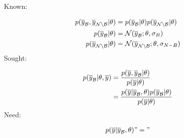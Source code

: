 Known:

\begin{align}
  p(\overline{y}_{\mathcal{B}}, \overline{y}_{\mathcal{N} \setminus \mathcal{B}} | \theta ) &= p(\overline{y}_{\mathcal{B}} | \theta) p(\overline{y}_{\mathcal{N} \setminus \mathcal{B}} | \theta ) \nonumber \\
  p(\overline{y}_{\mathcal{B}} | \theta) &= \mathcal{N}(\overline{y}_{\mathcal{B}}; \theta, \sigma_B) \nonumber \\
  p(\overline{y}_{\mathcal{N} \setminus \mathcal{B}} | \theta) &= \mathcal{N}(\overline{y}_{\mathcal{N} \setminus \mathcal{B}}; \theta, \sigma_{N-B}) \nonumber \\
\end{align}
Sought:

\begin{align}
  p(\yBarB | \theta, \yBar ) &= \frac{p(\yBar, \yBarB | \theta)}{p(\yBar | \theta)}\nonumber \\
                             &= \frac{p(\yBar | \yBarB, \theta) p(\yBarB | \theta) }{p(\yBar | \theta)} \nonumber \\
  \label{eq:pyb_y}
\end{align}
Need:

\begin{align}
  p(\yBar | \yBarB, \theta) "="
  \label{eq:py_yb_theta}
\end{align}

